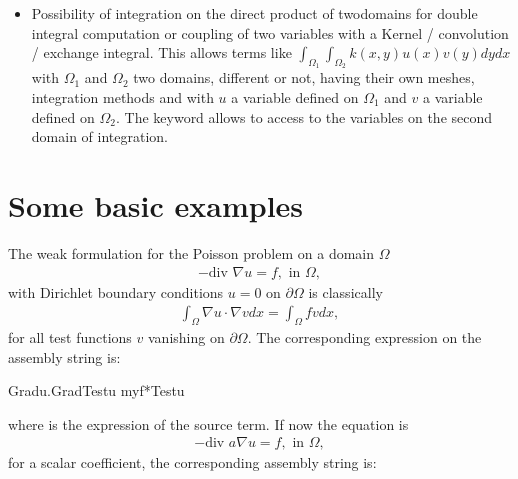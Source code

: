 \documentclass[a4paper,11pt,english]{sphinxmanual}
\begin{document}
\begin{itemize}
\item {} 
Possibility of integration on the direct product of two\sphinxhyphen{}domains for double integral computation or coupling of two variables with a Kernel / convolution / exchange integral. This allows terms like \(\displaystyle\int_{\Omega_1}\int_{\Omega_2}k(x,y)u(x)v(y)dydx\) with \(\Omega_1\) and \(\Omega_2\) two domains, different or not, having their own meshes, integration methods and with \(u\) a variable defined on \(\Omega_1\) and \(v\) a variable defined on \(\Omega_2\). The keyword  allows to access to the variables on the second domain of integration.

\end{itemize}


\section{Some basic examples}
\label{\detokenize{userdoc/gasm_high:some-basic-examples}}
The weak formulation for the Poisson problem on a domain \(\Omega\)
\begin{equation*}
\begin{split}-\mbox{div } \nabla u = f, \mbox{ in } \Omega,\end{split}
\end{equation*}
with Dirichlet boundary conditions \(u = 0\) on \(\partial\Omega\) is classically
\begin{equation*}
\begin{split}\int_{\Omega} \nabla u\cdot \nabla v dx = \int_{\Omega} f v dx,\end{split}
\end{equation*}
for all test functions \(v\) vanishing on  \(\partial\Omega\).
The corresponding expression on the assembly string is:

\begin{sphinxVerbatim}[commandchars=\\\{\}]
Grad\PYGZus{}u.Grad\PYGZus{}Test\PYGZus{}u \PYGZhy{} my\PYGZus{}f*Test\PYGZus{}u
\end{sphinxVerbatim}

where  is the expression of the source term. If now the equation is
\begin{equation*}
\begin{split}-\mbox{div } a\nabla u = f, \mbox{ in } \Omega,\end{split}
\end{equation*}
for  a scalar coefficient, the corresponding assembly string is:
\end{document}

